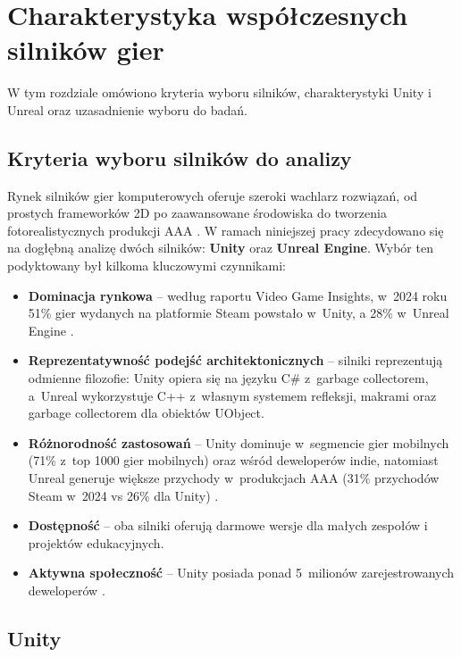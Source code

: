 \clearpage
\section{Charakterystyka współczesnych silników gier}

W tym rozdziale omówiono kryteria wyboru silników, charakterystyki Unity i Unreal oraz uzasadnienie wyboru do badań.

\subsection{Kryteria wyboru silników do analizy}

Rynek silników gier komputerowych oferuje szeroki wachlarz rozwiązań,
od prostych frameworków 2D po zaawansowane środowiska do tworzenia
fotorealistycznych produkcji AAA \cite{gregory2018game}.
W ramach niniejszej pracy zdecydowano
się na dogłębną analizę dwóch silników: \textbf{Unity}
oraz \textbf{Unreal Engine}. Wybór ten podyktowany był
kilkoma kluczowymi czynnikami:

\begin{itemize}
    \item \textbf{Dominacja rynkowa} -- według raportu Video Game Insights,
    w~2024 roku 51\% gier wydanych na platformie Steam powstało w~Unity,
    a 28\% w~Unreal Engine \cite{vgi2025engines}.
    \item \textbf{Reprezentatywność podejść architektonicznych} -- 
    silniki reprezentują odmienne filozofie: Unity opiera się na 
    języku C\# z~garbage collectorem, a~Unreal wykorzystuje C++ 
    z~własnym systemem refleksji, makrami oraz garbage collectorem 
    dla obiektów UObject.
    \item \textbf{Różnorodność zastosowań} -- Unity dominuje
    w~segmencie gier mobilnych (71\% z~top 1000 gier mobilnych)
    oraz wśród deweloperów indie, natomiast
    Unreal generuje większe przychody w~produkcjach AAA
    (31\% przychodów Steam w~2024 vs 26\% dla Unity)
    \cite{vgi2025engines, g2gameengines}.
    \item \textbf{Dostępność} -- oba silniki oferują darmowe wersje
    dla małych zespołów i projektów edukacyjnych.
    \item \textbf{Aktywna społeczność} -- Unity posiada ponad
    5~milionów zarejestrowanych deweloperów \cite{g2gameengines}.
\end{itemize}

\subsection{Unity}\label{subsec:unity}

